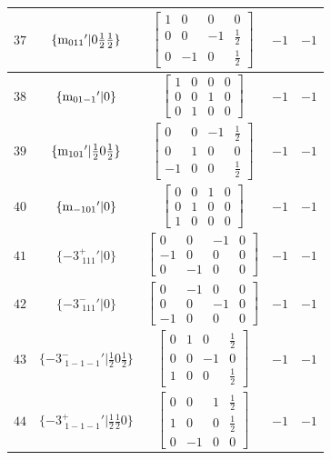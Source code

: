 \documentclass[fleqn,8pt]{jsarticle}
\begin{document}
\begin{longtable}{ccccc}
$ 37 $ & $ \{{\rm m}_{011}{}'|0 \frac{1}{2} \frac{1}{2}\} $ & $ \begin{bmatrix} 1 & 0 & 0 & 0 \\ 0 & 0 & -1 & \frac{1}{2} \\ 0 & -1 & 0 & \frac{1}{2} \end{bmatrix} $ & $ -1 $ & $ -1 $ \\ \hline
$ 38 $ & $ \{{\rm m}_{01-1}{}'|0\} $ & $ \begin{bmatrix} 1 & 0 & 0 & 0 \\ 0 & 0 & 1 & 0 \\ 0 & 1 & 0 & 0 \end{bmatrix} $ & $ -1 $ & $ -1 $ \\ \hline
$ 39 $ & $ \{{\rm m}_{101}{}'|\frac{1}{2} 0 \frac{1}{2}\} $ & $ \begin{bmatrix} 0 & 0 & -1 & \frac{1}{2} \\ 0 & 1 & 0 & 0 \\ -1 & 0 & 0 & \frac{1}{2} \end{bmatrix} $ & $ -1 $ & $ -1 $ \\ \hline
$ 40 $ & $ \{{\rm m}_{-101}{}'|0\} $ & $ \begin{bmatrix} 0 & 0 & 1 & 0 \\ 0 & 1 & 0 & 0 \\ 1 & 0 & 0 & 0 \end{bmatrix} $ & $ -1 $ & $ -1 $ \\ \hline
$ 41 $ & $ \{-3^{+}_{\,\,111}{}'|0\} $ & $ \begin{bmatrix} 0 & 0 & -1 & 0 \\ -1 & 0 & 0 & 0 \\ 0 & -1 & 0 & 0 \end{bmatrix} $ & $ -1 $ & $ -1 $ \\ \hline
$ 42 $ & $ \{-3^{-}_{\,\,111}{}'|0\} $ & $ \begin{bmatrix} 0 & -1 & 0 & 0 \\ 0 & 0 & -1 & 0 \\ -1 & 0 & 0 & 0 \end{bmatrix} $ & $ -1 $ & $ -1 $ \\ \hline
$ 43 $ & $ \{-3^{-}_{\,\,1-1-1}{}'|\frac{1}{2} 0 \frac{1}{2}\} $ & $ \begin{bmatrix} 0 & 1 & 0 & \frac{1}{2} \\ 0 & 0 & -1 & 0 \\ 1 & 0 & 0 & \frac{1}{2} \end{bmatrix} $ & $ -1 $ & $ -1 $ \\ \hline
$ 44 $ & $ \{-3^{+}_{\,\,1-1-1}{}'|\frac{1}{2} \frac{1}{2} 0\} $ & $ \begin{bmatrix} 0 & 0 & 1 & \frac{1}{2} \\ 1 & 0 & 0 & \frac{1}{2} \\ 0 & -1 & 0 & 0 \end{bmatrix} $ & $ -1 $ & $ -1 $ \\ \hline

\end{longtable}
\end{document}

